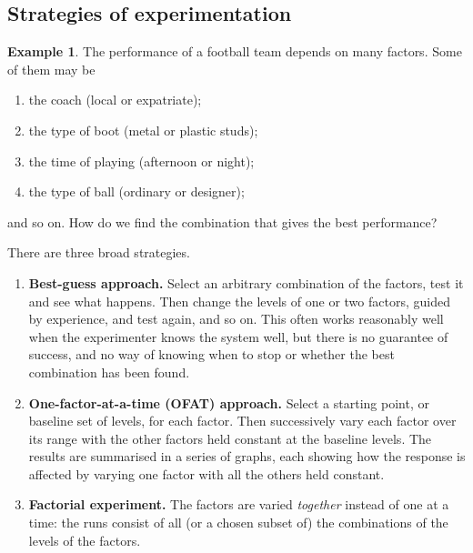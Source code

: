 \documentclass[11pt,a4paper]{article}
\numberwithin{equation}{section}
\theoremstyle{definition}
\newtheorem{exa}[thm]{Example}
\begin{document}
\subsection{Strategies of experimentation}
\begin{exa}\label{exa:football}
The performance of a football team depends on many factors. Some of them may be
\begin{enumerate}[label=(\alph*)]
\item the coach (local or expatriate);
\item the type of boot (metal or plastic studs);
\item the time of playing (afternoon or night);
\item the type of ball (ordinary or designer);
\end{enumerate}
and so on. How do we find the combination that gives the best performance?
\end{exa}

There are three broad strategies.

\begin{enumerate}[label=(\roman*)]
\item \textbf{Best-guess approach.} Select an arbitrary combination of the factors, test it and see what happens. Then change the levels of one or
two factors, guided by experience, and test again, and so on. This often works reasonably well when the experimenter knows the system
well, but there is no guarantee of success, and no way of knowing when to stop or whether the best combination has been found.
\item \textbf{One-factor-at-a-time (OFAT) approach.} Select a starting point, or baseline set of levels, for each factor. Then successively vary each
factor over its range with the other factors held constant at the baseline levels. The results are summarised in a series of graphs, each
showing how the response is affected by varying one factor with all the others held constant.
\item \textbf{Factorial experiment.} The factors are varied \emph{together} instead of one at a time: the runs consist of all (or a chosen subset of)
the combinations of the levels of the factors.
\end{enumerate}
\end{document}
